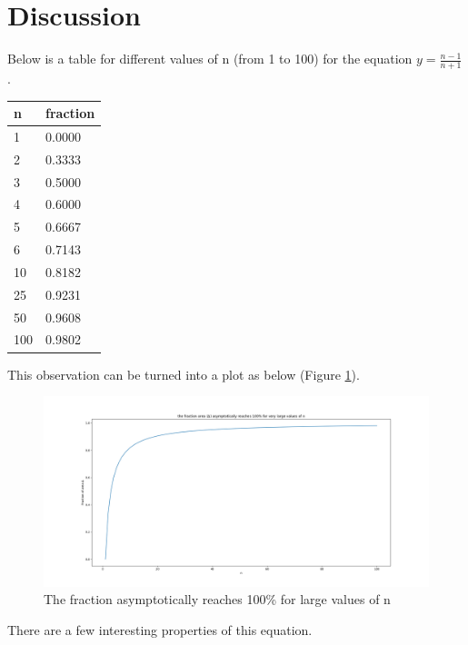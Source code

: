 \documentclass[10pt, twoside]{article}
\begin{document}
\section{Discussion}
Below is a table for different values of n (from 1 to 100) for the equation $y=\frac{n-1}{n+1}$.\newline
\begin{tabular}{|l || l |}
	\hline
	\textbf{n} & \textbf{fraction} \\
	\hline
	1 & 0.0000 \\
	\hline
	2 & 0.3333 \\
	\hline
	3 & 0.5000 \\
	\hline
	4 & 0.6000 \\
	\hline
	5 & 0.6667 \\
	\hline
	6 & 0.7143 \\
	\hline
	10 & 0.8182 \\
	\hline
	25 & 0.9231 \\
	\hline
	50 & 0.9608 \\
	\hline
	100 & 0.9802 \\
	\hline
\end{tabular}
\newline
\newline
This observation can be turned into a plot as below (Figure \ref{n_vs_frac}).\newline
\begin{figure}[h!]
\includegraphics[width=\linewidth]{Overall_Plot.png}
\caption{The fraction asymptotically reaches 100\% for large values of n}
\label{n_vs_frac}
\end{figure}
\newline
\newline
There are a few interesting properties of this equation.
\end{document}
